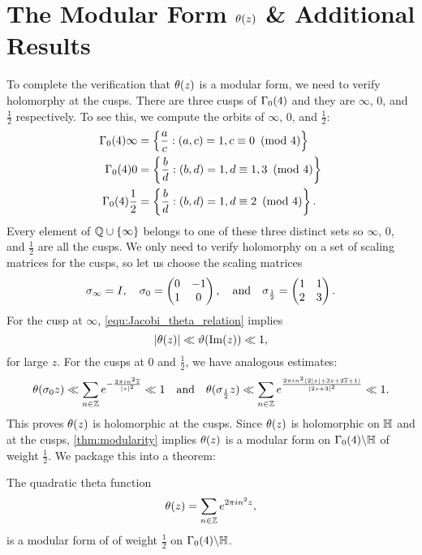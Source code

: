 \documentclass[12pt,reqno,oneside]{amsart}
\begin{document}
\section{The Modular Form \texorpdfstring{$\theta(z)$}{t(z)} \& Additional Results}
    To complete the verification that $\theta(z)$ is a modular form, we need to verify holomorphy at the cusps. There are three cusps of $\Gamma_{0}(4)$ and they are $\infty$, $0$, and $\frac{1}{2}$ respectively. To see this, we compute the orbits of $\infty$, $0$, and $\frac{1}{2}$:
    \begin{align*}
        \Gamma_{0}(4)\infty &= \left\{\frac{a}{c}:(a,c) = 1, c \equiv 0 \ \left(\text{mod }4\right) \right\} \\
        \Gamma_{0}(4)0 &= \left\{\frac{b}{d}:(b,d) = 1, d \equiv 1,3 \ \left(\text{mod }4\right) \right\} \\
        \Gamma_{0}(4)\frac{1}{2} &= \left\{\frac{b}{d}:(b,d) = 1, d \equiv 2 \ \left(\text{mod }4\right) \right\}.
    \end{align*}
    Every element of $\mathbb{Q} \cup \{\infty\}$ belongs to one of these three distinct sets so $\infty$, $0$, and $\frac{1}{2}$ are all the cusps. We only need to verify holomorphy on a set of scaling matrices for the cusps, so let us choose the scaling matrices
    \[
        \sigma_{\infty} = I, \quad \sigma_{0} = \begin{pmatrix} 0 & -1 \\ 1 & 0 \end{pmatrix}, \quad \text{and} \quad \sigma_{\frac{1}{2}} = \begin{pmatrix} 1 & 1 \\ 2 & 3 \end{pmatrix}.
    \]
    For the cusp at $\infty$, \cref{equ:Jacobi_theta_relation} implies
    \[
        |\theta(z)| \ll \vartheta(\mathrm{Im}(z)) \ll 1,
    \]
    for large $z$. For the cusps at $0$ and $\frac{1}{2}$, we have analogous estimates:
    \[
    \theta(\sigma_{0} z) \ll \sum_{n \in \mathbb{Z}}e^{-\frac{2\pi in^{2}\overline{z}}{|z|^{2}}} \ll 1 \quad \text{and} \quad \theta(\sigma_{\frac{1}{2}} z) \ll \sum_{n \in \mathbb{Z}}e^{\frac{2\pi in^{2}(2|z|+3z+2\overline{z}+1)}{|2z+3|^{2}}} \ll 1.
    \]
    This proves $\theta(z)$ is holomorphic at the cusps. Since $\theta(z)$ is holomorphic on $\mathbb{H}$ and at the cusps, \cref{thm:modularity} implies $\theta(z)$ is a modular form on $\Gamma_{0}(4)\backslash\mathbb{H}$ of weight $\frac{1}{2}$. We package this into a theorem:

    \begin{theorem}\label{thm:quadratic_theta_is_modular}
    The quadratic theta function
    \[
        \theta(z) = \sum_{n \in \mathbb{Z}}e^{2\pi in^{2}z},
    \]
    is a modular form of of weight $\frac{1}{2}$ on $\Gamma_{0}(4)\backslash\mathbb{H}$.
    \end{theorem}
\end{document}
